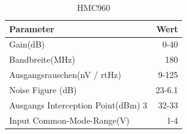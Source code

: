 \begin{table}[tbp]
  \centering
  \begin{tabular}{l r}
    Parameter & Wert\\
    \hline
	Gain(dB) & 0-40\\
	Bandbreite(MHz) & 180 \\
	Ausgangsrauschen(nV / rtHz) &   9-125 \\
	Noise Figure (dB) & 23-6.1\\
	Ausgangs Interception Point(dBm) 3 & 32-33\\
	Input Common-Mode-Range(V) & 1-4 \\
	
  \end{tabular}
  \caption{HMC960}
  \label{tab:HMC960}
\end{table}